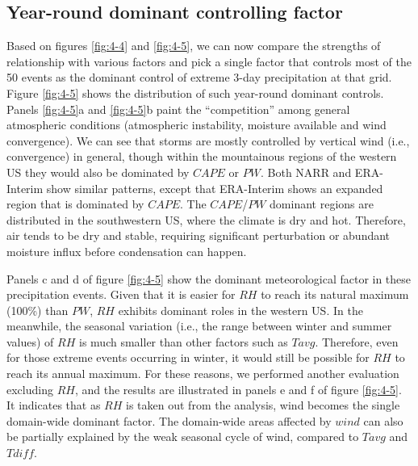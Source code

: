 \subsection{Year-round dominant controlling factor}

Based on figures \ref{fig:4-4} and \ref{fig:4-5}, we can now compare the strengths of relationship with various factors and pick a single factor that controls most of the 50 events as the dominant control of extreme 3-day precipitation at that grid. Figure \ref{fig:4-5} shows the distribution of such year-round dominant controls. Panels \ref{fig:4-5}a and \ref{fig:4-5}b paint the “competition” among general atmospheric conditions (atmospheric instability, moisture available and wind convergence). We can see that storms are mostly controlled by vertical wind (i.e., convergence) in general, though within the mountainous regions of the western US they would also be dominated by $CAPE$ or $PW$. Both NARR and ERA-Interim show similar patterns, except that ERA-Interim shows an expanded region that is dominated by $CAPE$. The $CAPE$/$PW$ dominant regions are distributed in the southwestern US, where the climate is dry and hot. Therefore, air tends to be dry and stable, requiring significant perturbation or abundant moisture influx before condensation can happen.

Panels c and d of figure \ref{fig:4-5} show the dominant meteorological factor in these precipitation events. Given that it is easier for $RH$ to reach its natural maximum (100\%) than $PW$, $RH$ exhibits dominant roles in the western US. In the meanwhile, the seasonal variation (i.e., the range between winter and summer values) of $RH$ is much smaller than other factors such as $Tavg$. Therefore, even for those extreme events occurring in winter, it would still be possible for $RH$ to reach its annual maximum. For these reasons, we performed another evaluation excluding $RH$, and the results are illustrated in panels e and f of figure \ref{fig:4-5}. It indicates that as $RH$ is taken out from the analysis, wind becomes the single domain-wide dominant factor. The domain-wide areas affected by $wind$ can also be partially explained by the weak seasonal cycle of wind, compared to $Tavg$ and $Tdiff$.

